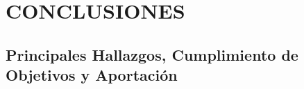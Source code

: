 \chapter{CONCLUSIONES}\label{ch:conclusiones}

\section{Principales Hallazgos, Cumplimiento de Objetivos y Aportación}\label{sec:conclusiones-hallazgos}